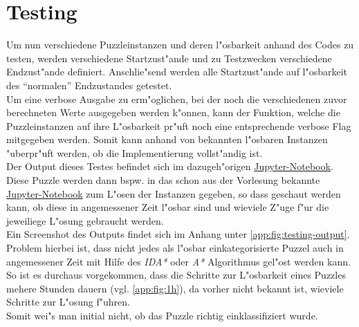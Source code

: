 \section{Testing} %
\label{cha:Testing}
Um nun verschiedene Puzzleinstanzen und deren l"osbarkeit anhand des Codes zu testen, werden verschiedene Startzust"ande und zu Testzwecken verschiedene Endzust"ande definiert. Anschlie"send werden alle Startzust"ande auf l"osbarkeit des \enquote{normalen} Endzustandes getestet.\\
Um eine verbose Ausgabe zu erm"oglichen, bei der noch die verschiedenen zuvor berechneten Werte ausgegeben werden k"onnen, kann der Funktion, welche die Puzzleinstanzen auf ihre L"osbarkeit pr"uft noch eine entsprechende verbose Flag mitgegeben werden. Somit kann anhand von bekannten l"osbaren Instanzen "uberpr"uft werden, ob die Implementierung vollst"andig ist.\\
Der Output dieses Testes befindet sich im dazugeh"origen \textcolor{violet}{\href{https://github.com/stubifox/ai-termpaper/blob/main/code/15-solvable-v1.ipynb}{Jupyter-Notebook}}.\\
Diese Puzzle werden dann bspw. in das schon aus der Vorlesung bekannte \textcolor{violet}{\href{https://github.com/karlstroetmann/Artificial-Intelligence/blob/master/Python/1\%20Search/Iterative-Deepening-A-Star-Search.ipynb}{Jupyter-Notebook}} zum L"osen der Instanzen gegeben, so dass geschaut werden kann, ob diese in angemessener Zeit l"osbar sind und wieviele Z"uge f"ur die jeweiliege L"osung gebraucht werden. \\
Ein Screenshot des Outputs findet sich im Anhang unter \ref{app:fig:testing-output}.
Problem hierbei ist, dass nicht jedes als l"osbar einkategorisierte Puzzel auch in angemessener Zeit mit Hilfe des \textit{IDA*} oder \textit{A*} Algorithmus gel"ost werden kann. So ist es durchaus vorgekommen, dass die Schritte zur L"osbarkeit eines Puzzles mehere Stunden dauern (vgl. \ref{app:fig:1h}), da vorher nicht bekannt ist, wieviele Schritte zur L"osung f"uhren.\\
Somit wei"s man initial nicht, ob das Puzzle richtig einklassifiziert wurde.
